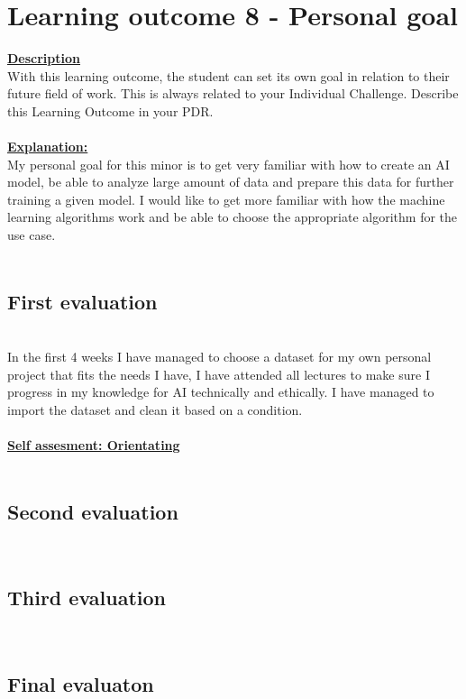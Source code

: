 \documentclass{article}
\begin{document}
\section{Learning outcome 8 - Personal goal}
\underline{\textbf{Description}}\\
With this learning outcome, the student can set its own goal in relation to their future field of work.
This is always related to your Individual Challenge. Describe this Learning Outcome in your PDR.\\\\
\underline{\textbf{Explanation:}}\\
My personal goal for this minor is to get very familiar with how to create an AI model, be able to analyze large amount of data
and prepare this data for further training a given model. I would like to get more familiar with how the machine learning algorithms work 
and be able to choose the appropriate algorithm for the use case.\\\\
\subsection{First evaluation}\\
In the first 4 weeks I have managed to choose a dataset for my own personal project that fits the needs I have, I have attended all lectures to make 
sure I progress in my knowledge for AI technically and ethically. I have managed to import the dataset and clean it based on a condition.\\\\ 
\underline{\textbf{Self assesment: Orientating}}\\\\
\subsection{Second evaluation}\\
\subsection{Third evaluation}\\
\subsection{Final evaluaton}\\\\
\end{document}
